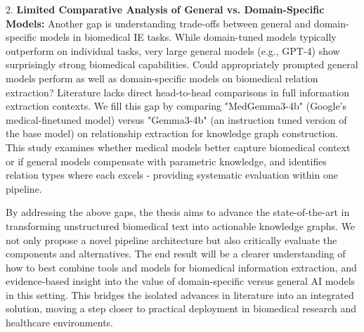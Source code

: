2. \textbf{Limited Comparative Analysis of General vs. Domain-Specific Models:} Another gap is understanding trade-offs between general and domain-specific models in biomedical IE tasks. While domain-tuned models typically outperform on individual tasks, very large general models (e.g., GPT-4) show surprisingly strong biomedical capabilities. Could appropriately prompted general models perform as well as domain-specific models on biomedical relation extraction? Literature lacks direct head-to-head comparisons in full information extraction contexts. We fill this gap by comparing "MedGemma3-4b" (Google's medical-finetuned model) versus "Gemma3-4b" (an instruction tuned version of the base model) on relationship extraction for knowledge graph construction. This study examines whether medical models better capture biomedical context or if general models compensate with parametric knowledge, and identifies relation types where each excels - providing systematic evaluation within one pipeline.

By addressing the above gaps, the thesis aims to advance the state-of-the-art in transforming unstructured biomedical text into actionable knowledge graphs. We not only propose a novel pipeline architecture but also critically evaluate the components and alternatives. The end result will be a clearer understanding of how to best combine tools and models for biomedical information extraction, and evidence-based insight into the value of domain-specific versus general AI models in this setting. This bridges the isolated advances in literature into an integrated solution, moving a step closer to practical deployment in biomedical research and healthcare environments.
